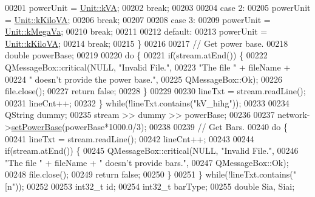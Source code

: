 \begin{DoxyCode}
00201     powerUnit = \hyperlink{class_unit_ace265ae255370ccacfd5370337572c3ba72b181a842ae2759488a2fa1410d3696}{Unit::kVA};
00202     \textcolor{keywordflow}{break};
00203 
00204   \textcolor{keywordflow}{case} 2:
00205     powerUnit = \hyperlink{class_unit_ace265ae255370ccacfd5370337572c3bac9e5154522fbb810d7aed75c3ff47cb2}{Unit::kKiloVA};
00206     \textcolor{keywordflow}{break};
00207 
00208   \textcolor{keywordflow}{case} 3:
00209     powerUnit = \hyperlink{class_unit_ace265ae255370ccacfd5370337572c3ba6039da0ed20f8bee64305bab8bdec365}{Unit::kMegaVa};
00210     \textcolor{keywordflow}{break};
00211 
00212   \textcolor{keywordflow}{default}:
00213     powerUnit = \hyperlink{class_unit_ace265ae255370ccacfd5370337572c3bac9e5154522fbb810d7aed75c3ff47cb2}{Unit::kKiloVA};
00214     \textcolor{keywordflow}{break};
00215   \}
00216 
00217   \textcolor{comment}{// Get power base.}
00218   \textcolor{keywordtype}{double} powerBase;
00219 
00220   \textcolor{keywordflow}{do} \{
00221     \textcolor{keywordflow}{if}(stream.atEnd()) \{
00222       QMessageBox::critical(NULL, \textcolor{stringliteral}{"Invalid File."},
00223                             \textcolor{stringliteral}{"The file "} + fileName +
00224                             \textcolor{stringliteral}{" doesn't provide the power base."},
00225                             QMessageBox::Ok);
00226       file.close();
00227       \textcolor{keywordflow}{return} \textcolor{keyword}{false};
00228     \}
00229 
00230     lineTxt = stream.readLine();
00231     lineCnt++;
00232   \} \textcolor{keywordflow}{while}(!lineTxt.contains(\textcolor{stringliteral}{"kV\_hihg"}));
00233 
00234   QString dummy;
00235   stream >> dummy >> powerBase;
00236 
00237   network->\hyperlink{group___models_ga3ba9ef05ea0c5037a415cfab25d03a0d}{setPowerBase}(powerBase*1000.0/3);
00238 
00239   \textcolor{comment}{// Get Bars.}
00240   \textcolor{keywordflow}{do} \{
00241     lineTxt = stream.readLine();
00242     lineCnt++;
00243 
00244     \textcolor{keywordflow}{if}(stream.atEnd()) \{
00245       QMessageBox::critical(NULL, \textcolor{stringliteral}{"Invalid File."},
00246                             \textcolor{stringliteral}{"The file "} + fileName + \textcolor{stringliteral}{" doesn't provide bars."},
00247                             QMessageBox::Ok);
00248       file.close();
00249       \textcolor{keywordflow}{return} \textcolor{keyword}{false};
00250     \}
00251   \} \textcolor{keywordflow}{while}(!lineTxt.contains(\textcolor{stringliteral}{"[n"}));
00252 
00253   int32\_t id;
00254   int32\_t barType;
00255   \textcolor{keywordtype}{double} Sia, Siai;

\end{DoxyCode}
